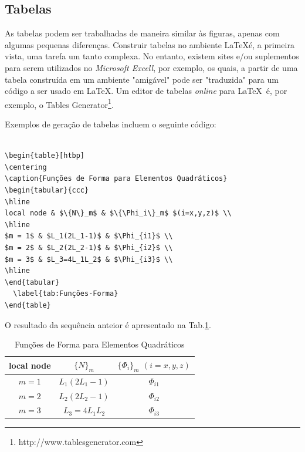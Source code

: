 \documentclass[12pt,A4,A4pt]{article}
\begin{document}
\subsection{Tabelas}

As tabelas podem ser trabalhadas de maneira similar às figuras, apenas com algumas pequenas diferenças. Construir tabelas no ambiente \LaTeX é, a primeira vista, uma tarefa um tanto complexa. No entanto, existem sites e/ou suplementos para serem utilizados no \textit{Microsoft Excell}, por exemplo, os quais, a partir de uma tabela construída em um ambiente "amigável" pode ser "traduzida" para um código a ser usado em \LaTeX. Um editor de tabelas \emph{online} para \LaTeX\ é, por exemplo, o Tables Generator\footnote{http://www.tablesgenerator.com}.

Exemplos de geração de tabelas incluem o seguinte código:

\begin{verbatim}

\begin{table}[htbp]
\centering
\caption{Funções de Forma para Elementos Quadráticos}
\begin{tabular}{ccc}
\hline
local node & $\{N\}_m$ & $\{\Phi_i\}_m$ $(i=x,y,z)$ \\
\hline
$m = 1$ & $L_1(2L_1-1)$ & $\Phi_{i1}$ \\
$m = 2$ & $L_2(2L_2-1)$ & $\Phi_{i2}$ \\
$m = 3$ & $L_3=4L_1L_2$ & $\Phi_{i3}$ \\
\hline
\end{tabular}
  \label{tab:Funções-Forma}
\end{table}

\end{verbatim}

O resultado da sequência anteior é apresentado na Tab.\ref{tab:Funções-Forma}.

\begin{table}[htbp]
\small
\centering
\caption{\small Funções de Forma para Elementos Quadráticos}
\begin{tabular}{ccc}
\hline
local node & $\{N\}_m$ & $\{\Phi_i\}_m$ $(i=x,y,z)$ \\
\hline
$m = 1$ & $L_1(2L_1-1)$ & $\Phi_{i1}$ \\
$m = 2$ & $L_2(2L_2-1)$ & $\Phi_{i2}$ \\
$m = 3$ & $L_3=4L_1L_2$ & $\Phi_{i3}$ \\
\hline
\end{tabular}
  \label{tab:Funções-Forma}
\end{table}
\end{document}
